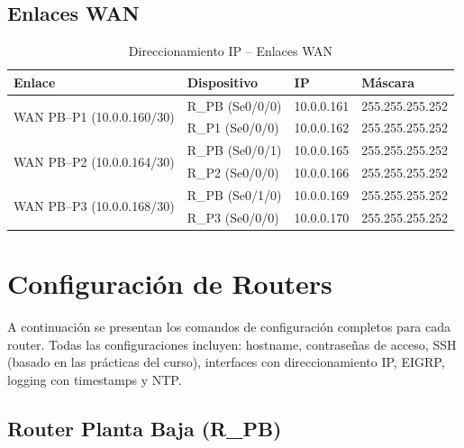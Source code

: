 \documentclass[letterpaper,11pt]{article}
\begin{document}
\subsection{Enlaces WAN}

\begin{table}[H]
\centering
\caption{Direccionamiento IP -- Enlaces WAN}
\small
\begin{tabular}{|l|l|l|l|}
\hline
\textbf{Enlace} & \textbf{Dispositivo} & \textbf{IP} & \textbf{Máscara} \\
\hline
\multirow{2}{*}{WAN PB--P1 (10.0.0.160/30)} & R\_PB (Se0/0/0) & 10.0.0.161 & 255.255.255.252 \\
\cline{2-4}
 & R\_P1 (Se0/0/0) & 10.0.0.162 & 255.255.255.252 \\
\hline
\multirow{2}{*}{WAN PB--P2 (10.0.0.164/30)} & R\_PB (Se0/0/1) & 10.0.0.165 & 255.255.255.252 \\
\cline{2-4}
 & R\_P2 (Se0/0/0) & 10.0.0.166 & 255.255.255.252 \\
\hline
\multirow{2}{*}{WAN PB--P3 (10.0.0.168/30)} & R\_PB (Se0/1/0) & 10.0.0.169 & 255.255.255.252 \\
\cline{2-4}
 & R\_P3 (Se0/0/0) & 10.0.0.170 & 255.255.255.252 \\
\hline
\end{tabular}
\end{table}

\section{Configuración de Routers}

A continuación se presentan los comandos de configuración completos para cada router. Todas las configuraciones incluyen: hostname, contraseñas de acceso, SSH (basado en las prácticas del curso), interfaces con direccionamiento IP, EIGRP, logging con timestamps y NTP.

\subsection{Router Planta Baja (R\_PB)}
\end{document}
